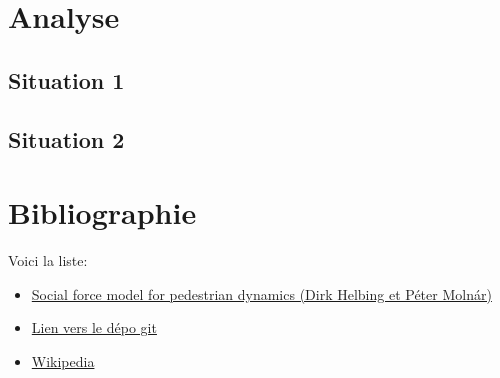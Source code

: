 \documentclass[a4paper,12pt]{article}
\begin{document}
\section{Analyse}
\subsection{Situation 1}



\subsection{Situation 2}

\newpage



\section{Bibliographie}

Voici la liste:

\vspace{1em}

\begin{itemize}
	\item \href{https://journals.aps.org/pre/abstract/10.1103/PhysRevE.51.4282}{Social force model for pedestrian dynamics (Dirk Helbing et Péter Molnár)}
	\item \href{https://www.google.com}{Lien vers le dépo git}
	\item \href{https://www.wikipedia.org}{Wikipedia}
\end{itemize}
\end{document}

